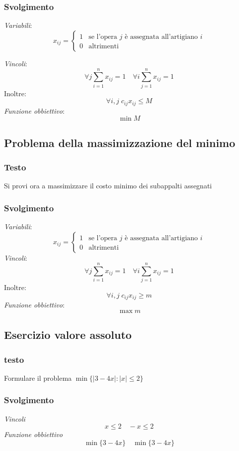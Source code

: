 \subsubsection{Svolgimento}
\textit{Variabili}:
\[
    x_{ij} = \begin{cases}
        1 & \text{se l'opera $j$ è assegnata all'artigiano $i$}\\
        0 & \text{altrimenti}
    \end{cases}
\]

\textit{Vincoli}:
\[
    \forall j \sum^n_{i=1}x_{ij}=1 \quad \forall i \sum_{j=1}^n x_{ij}=1 
\]
Inoltre: 
\[
    \forall i, j\; c_{ij}x_{ij}\leq M
\]
\textit{Funzione obbiettivo}:
\[
    \min M
\]

\subsection{Problema della massimizzazione del minimo}
\subsubsection{Testo}
Si provi ora a massimizzare il costo minimo dei subappalti assegnati
\subsubsection{Svolgimento}
\textit{Variabili}:
\[
    x_{ij} = \begin{cases}
        1 & \text{se l'opera $j$ è assegnata all'artigiano $i$}\\
        0 & \text{altrimenti}
    \end{cases}
\]
\textit{Vincoli}:
\[
    \forall j \sum^n_{i=1}x_{ij}=1 \quad \forall i \sum_{j=1}^n x_{ij}=1
\]
Inoltre:
\[
    \forall i, j\; c_{ij}x_{ij}\geq m
\]
\textit{Funzione obbiettivo}:
\[
    \max m
\]

\subsection{Esercizio valore assoluto}
\subsubsection{testo}
Formulare il problema $\min\{|3 - 4x| : |x| \leq 2\}$
\subsubsection{Svolgimento}
\textit{Vincoli}
\[
    x \leq 2 \quad -x\leq 2
\]
\textit{Funzione obbiettivo}
\[
    \min\{3-4x\} \quad \min\{3-4x\}
\]


